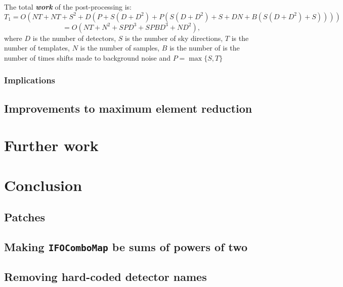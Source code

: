 \documentclass{article}
\begin{document}
The total \textit{\textbf{work}} of the post-processing is:
\[
    T_1 = O(NT + NT + S^2 + D(P + S(D + D^2) + P(S(D + D^2) + S + DN + B(S(D + D^2) + S))))
\]
\begin{equation} \label{eq:total_work}
    = O(NT + N^2 + SPD^3 + SPBD^3 + ND^2),
\end{equation}
where \(D\) is the number of detectors, \(S\) is the number of sky directions, \(T\) is the number of templates, \(N\) is the number of samples, \(B\) is the number of is the number of times shifts made to background noise and \(P = \max\{ S, T \}\)

\subsubsection{Implications} \label{sec:discuss:analysis:implications}


\subsection{Improvements to maximum element reduction} \label{sec:discuss:benchmark}

\section{Further work} \label{sec:further_work}

\section{Conclusion} \label{sec:conclusion}

\printbibliography[heading=bibintoc]{}

\begin{appendices}
    \section{Patches} \label{app:patches}
    \subsection{Making \texttt{IFOComboMap} be sums of powers of two} \label{app:patches:icombo}
    \linespread{0.3}
    \footnotesize{}
    \linespread{1}
    \subsection{Removing hard-coded detector names} \label{app:patches:ndetector}
    \linespread{0.3}
    \footnotesize{}
    \linespread{1}
\end{appendices}
\end{document}

